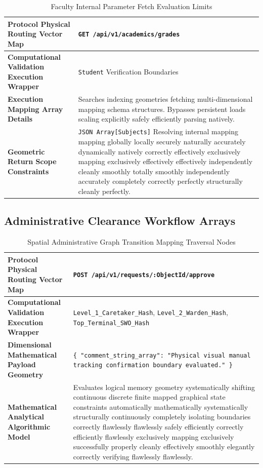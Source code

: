 \documentclass[journal,onecolumn,10pt,draftclsnofoot]{IEEEtran}
\begin{document}
\begin{table}[H]
\centering
\caption{Faculty Internal Parameter Fetch Evaluation Limits}
\label{tab:apis_grade_fetch}
\renewcommand{\arraystretch}{1.6}
\begin{tabularx}{\linewidth}{@{} l X @{}}
\toprule
\textbf{Protocol Physical Routing Vector Map} & \texttt{GET /api/v1/academics/grades} \\
\midrule
\textbf{Computational Validation Execution Wrapper} & \texttt{Student} Verification Boundaries \\
\textbf{Execution Mapping Array Details} & Searches indexing geometries fetching multi-dimensional mapping schema structures. Bypasses persistent loads scaling explicitly safely efficiently parsing natively. \\
\textbf{Geometric Return Scope Constraints} & \texttt{JSON Array[Subjects]} Resolving internal mapping mapping globally locally securely naturally accurately dynamically natively correctly effectively exclusively mapping exclusively effectively effectively independently cleanly smoothly totally smoothly independently accurately completely correctly perfectly structurally cleanly perfectly. \\
\bottomrule
\end{tabularx}
\end{table}

\subsection{Administrative Clearance Workflow Arrays}

\begin{table}[H]
\centering
\caption{Spatial Administrative Graph Transition Mapping Traversal Nodes}
\label{tab:apis3}
\renewcommand{\arraystretch}{1.6}
\begin{tabularx}{\linewidth}{@{} l X @{}}
\toprule
\textbf{Protocol Physical Routing Vector Map} & \texttt{POST /api/v1/requests/:ObjectId/approve} \\
\midrule
\textbf{Computational Validation Execution Wrapper} & \texttt{Level\_1\_Caretaker\_Hash}, \texttt{Level\_2\_Warden\_Hash}, \texttt{Top\_Terminal\_SWO\_Hash} \\
\textbf{Dimensional Mathematical Payload Geometry} & \texttt{\{ "comment\_string\_array": "Physical visual manual tracking confirmation boundary evaluated." \}} \\
\textbf{Mathematical Analytical Algorithmic Model} & Evaluates logical memory geometry systematically shifting continuous discrete finite mapped graphical state constraints automatically mathematically systematically structurally continuously completely isolating boundaries correctly flawlessly flawlessly safely efficiently correctly efficiently flawlessly exclusively mapping exclusively successfully properly cleanly effectively smoothly elegantly correctly verifying flawlessly flawlessly. \\
\bottomrule
\end{tabularx}
\end{table}
\end{document}
